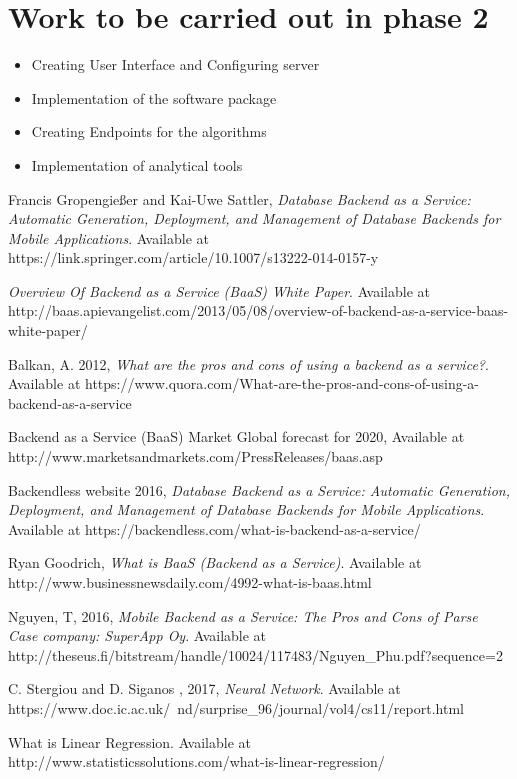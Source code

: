 \documentclass[a4paper,12pt]{report}
\begin{document}
    \section{Work to be carried out in phase 2}
    \begin{itemize}
      \item  Creating User Interface and Configuring server
      \item  Implementation of the software package
      \item  Creating Endpoints for the algorithms
      \item  Implementation of analytical tools 
    \end{itemize}    
    
    \renewcommand{\bibname}{References}
    \begin{thebibliography}{9}
    Francis Gropengießer and Kai-Uwe Sattler,
    \emph{Database Backend as a Service: Automatic Generation, Deployment, and Management of Database Backends for Mobile Applications}.
    Available at https://link.springer.com/article/10.1007/s13222-014-0157-y
    
    \emph{Overview Of Backend as a Service (BaaS) White Paper}.
    Available at http://baas.apievangelist.com/2013/05/08/overview-of-backend-as-a-service-baas-white-paper/
    
    
    Balkan, A. 2012,
    \emph{What are the pros and cons of using a backend as a service?}.
    Available at https://www.quora.com/What-are-the-pros-and-cons-of-using-a-backend-as-a-service
    
    Backend as a Service (BaaS) Market Global forecast for 2020,
    Available at http://www.marketsandmarkets.com/PressReleases/baas.asp		
    
    Backendless website 2016,
    \emph{Database Backend as a Service: Automatic Generation, Deployment, and Management of Database Backends for Mobile Applications}.
    Available at https://backendless.com/what-is-backend-as-a-service/
    
    
    Ryan Goodrich,
    \emph{What is BaaS (Backend as a Service)}.
    Available at http://www.businessnewsdaily.com/4992-what-is-baas.html	
    
    Nguyen, T, 2016,
    \emph{Mobile Backend as a Service: The Pros and Cons of Parse
    	Case company: SuperApp Oy}.
    Available at http://theseus.fi/bitstream/handle/10024/117483/Nguyen{\_}Phu.pdf?sequence=2
    
    C. Stergiou and D. Siganos , 2017,
    \emph{Neural Network}.
    Available at 
    https://www.doc.ic.ac.uk/~nd/surprise{\_}96/journal/vol4/cs11/report.html    
    
    What is Linear Regression.
    Available at http://www.statisticssolutions.com/what-is-linear-regression/
    
		
		\end{thebibliography}	
    
\end{document}
